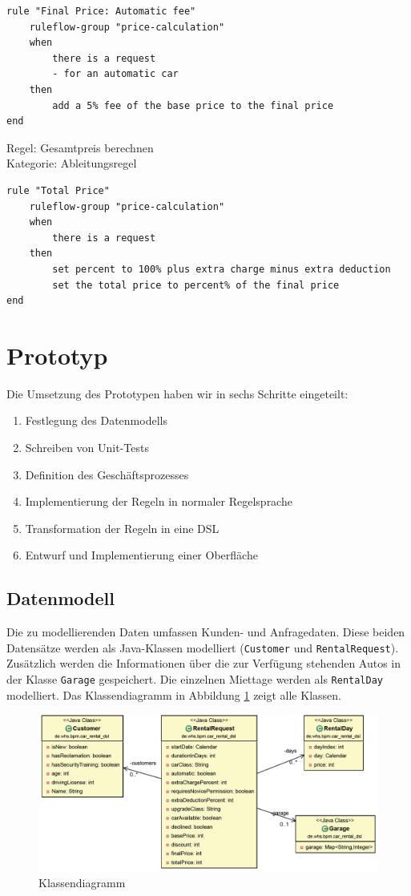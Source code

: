 \begin{lstlisting}
rule "Final Price: Automatic fee"
	ruleflow-group "price-calculation"
	when
		there is a request
		- for an automatic car
	then
		add a 5% fee of the base price to the final price
end
\end{lstlisting}

Regel: Gesamtpreis berechnen \\
Kategorie: Ableitungsregel

\begin{lstlisting}
rule "Total Price"
	ruleflow-group "price-calculation"
	when
		there is a request
	then
		set percent to 100% plus extra charge minus extra deduction
		set the total price to percent% of the final price
end
\end{lstlisting}


\newpage
\section{Prototyp}

Die Umsetzung des Prototypen haben wir in sechs Schritte eingeteilt:
\begin{enumerate}
	\item Festlegung des Datenmodells
	\item Schreiben von Unit-Tests
	\item Definition des Geschäftsprozesses
	\item Implementierung der Regeln in normaler Regelsprache
	\item Transformation der Regeln in eine DSL
	\item Entwurf und Implementierung einer Oberfläche
\end{enumerate}

\subsection{Datenmodell}

Die zu modellierenden Daten umfassen Kunden- und Anfragedaten. Diese beiden Datensätze
werden als Java-Klassen modelliert (\texttt{Customer} und \texttt{RentalRequest}). Zusätzlich werden die
Informationen über die zur Verfügung stehenden Autos in der Klasse \texttt{Garage} gespeichert.
Die einzelnen Miettage werden als \texttt{RentalDay} modelliert. Das Klassendiagramm in
Abbildung \ref{fig:Class_All} zeigt alle Klassen.

\begin{figure}[tbh]
\centering
\includegraphics[width=1.0\linewidth]{Bilder/Class_All}
\caption{Klassendiagramm}
\label{fig:Class_All}
\end{figure}

